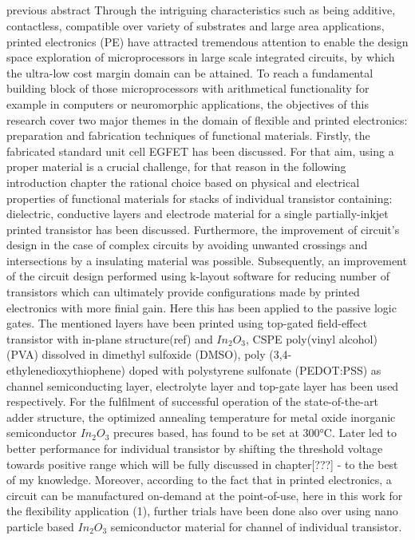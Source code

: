 \subsection{ }
\label{}
previous abstract
Through the intriguing characteristics such as being additive, contactless, compatible over variety of substrates and large area applications, printed electronics (PE) have attracted tremendous attention to enable the design space exploration of microprocessors in large scale integrated circuits, by which the ultra-low cost margin domain can be attained. To reach a fundamental building block of those microprocessors with arithmetical functionality for example in computers or neuromorphic applications, the objectives of this research cover two major themes in the domain of flexible and printed electronics: preparation and fabrication techniques of functional materials. 
Firstly, the fabricated standard unit cell EGFET has been discussed. For that aim, using a proper material is a crucial challenge, for that reason in the following introduction chapter the rational choice based on physical and electrical properties of functional materials for stacks of individual transistor containing: dielectric, conductive layers and electrode material for a single partially-inkjet printed transistor has been discussed. Furthermore, the improvement of circuit’s design in the case of complex circuits by avoiding unwanted crossings and intersections by a insulating material was possible. Subsequently, an improvement of the circuit design performed using k-layout software for reducing number of transistors which can ultimately provide configurations made by printed electronics with more finial gain. Here this has been applied to the passive logic gates. The mentioned layers have been printed using top-gated field-effect transistor with in-plane structure(ref) and $In_2O_3$, CSPE poly(vinyl alcohol) (PVA) dissolved in dimethyl sulfoxide (DMSO), poly (3,4- ethylenedioxythiophene) doped with polystyrene sulfonate (PEDOT:PSS) as channel semiconducting layer, electrolyte layer and top-gate layer has been used respectively. 
For the fulfilment of successful operation of the state-of-the-art adder structure, the optimized annealing temperature for metal oxide inorganic semiconductor $In_2O_3$ precures based, has found to be set at 300°C. Later led to better performance for individual transistor by shifting the threshold voltage towards positive range which will be fully discussed in chapter[???] - to the best of my knowledge. Moreover, according to the fact that in printed electronics, a circuit can be manufactured on-demand at the point-of-use, here in this work for the flexibility application (1), further trials have been done also over using nano particle based $In_2O_3$ semiconductor material for channel of individual transistor.
